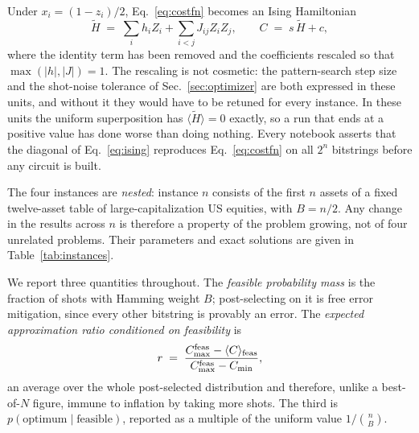 \documentclass[aps,prx,preprint,superscriptaddress,nofootinbib,longbibliography]{revtex4-2}
\begin{document}
Under $x_i = (1-z_i)/2$, Eq.~\eqref{eq:costfn} becomes an Ising Hamiltonian
\begin{equation}
  \tilde H \;=\; \sum_i h_i Z_i + \sum_{i<j} J_{ij} Z_i Z_j ,
  \qquad C \;=\; s\,\tilde H + c ,
  \label{eq:ising}
\end{equation}
where the identity term has been removed and the coefficients rescaled so that
$\max(|h|,|J|) = 1$. The rescaling is not cosmetic: the pattern-search step size and the
shot-noise tolerance of Sec.~\ref{sec:optimizer} are both expressed in these units, and
without it they would have to be retuned for every instance. In these units the uniform
superposition has $\langle\tilde H\rangle = 0$ exactly, so a run that ends at a positive value
has done worse than doing nothing. Every notebook asserts that the diagonal of
Eq.~\eqref{eq:ising} reproduces Eq.~\eqref{eq:costfn} on all $2^n$ bitstrings before any
circuit is built.

The four instances are \emph{nested}: instance $n$ consists of the first $n$ assets of a
fixed twelve-asset table of large-capitalization US equities, with $B = n/2$. Any change in
the results across $n$ is therefore a property of the problem growing, not of four unrelated
problems. Their parameters and exact solutions are given in Table~\ref{tab:instances}.

\begin{table}[t]
\caption{The four nested instances. $r$(uniform) is the expected approximation ratio of the
uniform distribution over the feasible set, the baseline any method must beat. All quantities
are exact, from enumeration of all $2^n$ bitstrings.}
\label{tab:instances}
\begin{ruledtabular}

\end{ruledtabular}
\end{table}

We report three quantities throughout. The \emph{feasible probability mass} is the fraction
of shots with Hamming weight $B$; post-selecting on it is free error mitigation, since every
other bitstring is provably an error. The \emph{expected approximation ratio conditioned on
feasibility} is
\begin{equation}
  r \;=\; \frac{C_{\max}^{\rm feas} - \langle C\rangle_{\rm feas}}
                {C_{\max}^{\rm feas} - C_{\min}} ,
  \label{eq:ratio}
\end{equation}
an average over the whole post-selected distribution and therefore, unlike a best-of-$N$
figure, immune to inflation by taking more shots. The third is
$p(\text{optimum}\mid\text{feasible})$, reported as a multiple of the uniform value
$1/\binom{n}{B}$.
\end{document}
